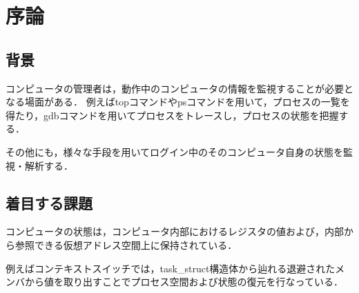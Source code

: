 \chapter{序論}
\label{chap:introduction}

\section{背景}
\label{section:background}






コンピュータの管理者は，動作中のコンピュータの情報を監視することが必要となる場面がある．
例えばtopコマンドやpsコマンドを用いて，プロセスの一覧を得たり，gdbコマンドを用いてプロセスをトレースし，プロセスの状態を把握する．

その他にも，様々な手段を用いてログイン中のそのコンピュータ自身の状態を監視・解析する．

\section{着目する課題}

コンピュータの状態は，コンピュータ内部におけるレジスタの値および，内部から参照できる仮想アドレス空間上に保持されている．

例えばコンテキストスイッチでは，task_struct構造体から辿れる退避されたメンバから値を取り出すことでプロセス空間および状態の復元を行なっている．

